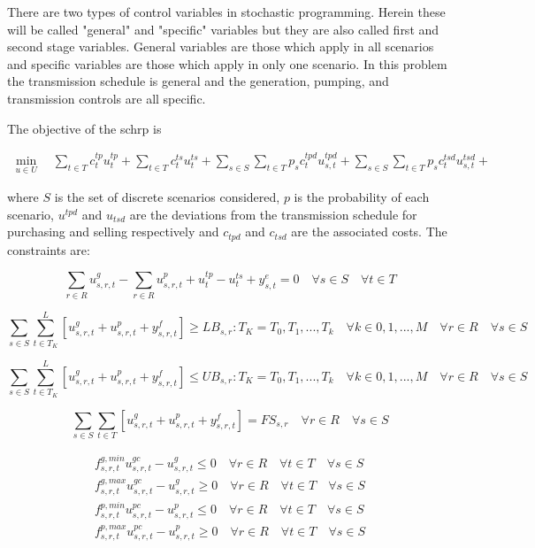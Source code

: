 \documentclass[12pt]{article}
\begin{document}
There are two types of control variables in stochastic programming. Herein these will be called "general" and "specific" variables but they are also called first and second stage variables. General variables are those which apply in all scenarios and specific variables are those which apply in only one scenario. In this problem the transmission schedule is general and the generation, pumping, and transmission controls are all specific.

The objective of the \gls{schrp} is

\begin{gather}
	\min_{u\in U}\quad
	\sum_{t\in T}c_{t}^{tp}u_{t}^{tp}+
	\sum_{t\in T}c_{t}^{ts}u_{t}^{ts}+
	\sum_{s \in S}\sum_{t\in T}p_sc_{t}^{tpd}u_{s,t}^{tpd}+
	\sum_{s \in S}\sum_{t\in T}p_sc_{t}^{tsd}u_{s,t}^{tsd}+
\end{gather}

where $S$ is the set of discrete scenarios considered, $p$ is the probability of each scenario, $u^{tpd}$ and $u_{tsd}$ are the deviations from the transmission schedule for purchasing and selling respectively and $c_{tpd}$ and $c_{tsd}$ are the associated costs. The constraints are:

\begin{equation}
	\sum_{r\in R}u_{s,r,t}^{g}-
	\sum_{r\in R}u_{s,r,t}^{p}+
	u_{t}^{tp}-
	u_{t}^{ts}+
	y_{s,t}^{e}=0\quad \forall s\in S \quad \forall t\in T\label{eq:coe_s}
\end{equation}

\begin{equation}
	\sum_{s \in S}\sum_{t\in T_K}^{L}[u_{s,r,t}^{g}+u_{s,r,t}^{p}+y_{s,r,t}^{f}]\geq LB_{s,r} : T_K=T_0,T_1,...,T_k \quad\forall k \in 0,1,...,M \quad\forall r \in R \quad\forall s \in S \label{eq:lb_s}
\end{equation}

\begin{equation}
	\sum_{s \in S}\sum_{t\in T_K}^{L}[u_{s,r,t}^{g}+u_{s,r,t}^{p}+y_{s,r,t}^{f}]\leq UB_{s,r} : T_K=T_0,T_1,...,T_k \quad\forall k \in 0,1,...,M \quad\forall r \in R \quad\forall s \in S \label{eq:ub_s}
\end{equation}

\begin{equation}
	\sum_{s \in S}\sum_{t\in T}[u_{s,r,t}^{g}+u_{s,r,t}^{p}+y_{s,r,t}^{f}]=FS_{s,r} \quad\forall r \in R \quad\forall s \in S \label{eq:fs_s}
\end{equation}

\begin{gather}
	f_{s,r,t}^{g,min}u_{s,r,t}^{gc}-u_{s,r,t}^{g}\leq 0 \quad\forall r \in R \quad\forall t \in T \quad\forall s \in S\\
	f_{s,r,t}^{g,max}u_{s,r,t}^{gc}-u_{s,r,t}^{g}\geq 0 \quad\forall r \in R \quad\forall t \in T \quad\forall s \in S\\
	f_{s,r,t}^{p,min}u_{s,r,t}^{pc}-u_{s,r,t}^{p}\leq 0 \quad\forall r \in R \quad\forall t \in T \quad\forall s \in S\\
	f_{s,r,t}^{p,max}u_{s,r,t}^{pc}-u_{s,r,t}^{p}\geq 0 \quad\forall r \in R \quad\forall t \in T \quad\forall s \in S
\end{gather}
\end{document}

